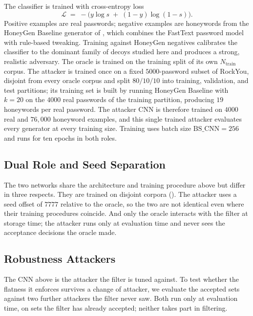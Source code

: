 The classifier is trained with cross-entropy loss
%
\begin{equation}
\mathcal{L} \;=\; -\bigl(y \log s \;+\; (1 - y) \log (1 - s)\bigr).
\end{equation}
%
Positive examples are real passwords; negative examples are honeywords
from the HoneyGen Baseline generator of ,
which combines the FastText password model with rule-based tweaking.
Training against HoneyGen negatives calibrates the classifier to the
dominant family of decoys studied here and produces a strong, realistic
adversary. The oracle is trained on the training split of its own
$N_{\text{train}}$ corpus. The attacker is trained once on a fixed
$5000$-password subset of RockYou, disjoint from every oracle corpus and
split $80/10/10$ into training, validation, and test partitions; its
training set is built by running HoneyGen Baseline with $k = 20$ on the
$4000$ real passwords of the training partition, producing $19$
honeywords per real password. The attacker CNN is therefore trained on
$4000$ real and $76{,}000$ honeyword examples, and this single trained
attacker evaluates every generator at every training size. Training uses
batch size $\text{BS\_CNN} = 256$ and runs for ten epochs in both roles.

\subsection{Dual Role and Seed Separation}

The two networks share the architecture and training procedure above but
differ in three respects. They are trained on disjoint corpora
(). The attacker uses a seed offset of $7777$
relative to the oracle, so the two are not identical even where their
training procedures coincide. And only the oracle interacts with the
filter at storage time; the attacker runs only at evaluation time and
never sees the acceptance decisions the oracle made.

\subsection{Robustness Attackers}
\label{sec:method-robustness-attackers}

The CNN above is the attacker the filter is tuned against. To test
whether the flatness it enforces survives a change of attacker, we
evaluate the accepted sets against two further attackers the filter
never saw. Both run only at evaluation time, on sets the filter has
already accepted; neither takes part in filtering.

